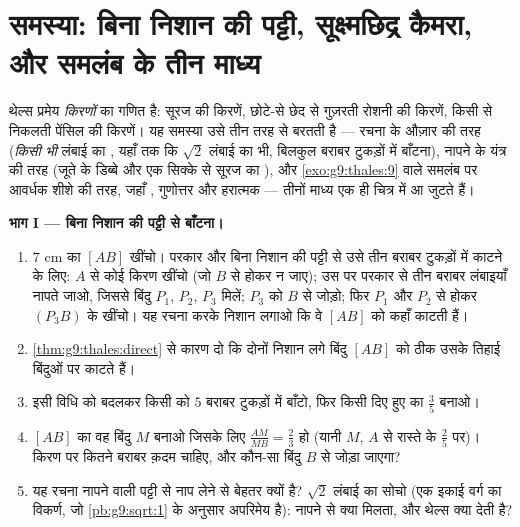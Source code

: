 \section{समस्या: बिना निशान की पट्टी, सूक्ष्मछिद्र कैमरा, और समलंब के
तीन माध्य}

\begin{problem}
\label{pb:g9:thales:1}
थेल्स प्रमेय \emph{किरणों} का गणित है: सूरज की किरणें, छोटे-से छेद से
गुज़रती रोशनी की किरणें, किसी  से निकलती पेंसिल की किरणें। यह
समस्या उसे तीन तरह से बरतती है --- रचना के औज़ार की तरह
(\emph{किसी भी} लंबाई का , यहाँ तक कि $\sqrt2$ लंबाई का भी,
बिलकुल बराबर टुकड़ों में बाँटना), नापने के यंत्र की तरह (जूते के
डिब्बे और एक सिक्के से सूरज का ), और \cref{exo:g9:thales:9} वाले
समलंब पर आवर्धक शीशे की तरह, जहाँ , गुणोत्तर और हरात्मक ---
तीनों माध्य एक ही चित्र में आ जुटते हैं।

\medskip
\noindent\textbf{भाग I --- बिना निशान की पट्टी से बाँटना।}
\begin{enumerate}
  \item $7$ cm का  $[AB]$ खींचो। परकार और बिना निशान की
        पट्टी से उसे तीन बराबर टुकड़ों में काटने के लिए: $A$ से कोई
        किरण खींचो (जो $B$ से होकर न जाए); उस पर परकार से तीन बराबर
        लंबाइयाँ नापते जाओ, जिससे बिंदु $P_1$, $P_2$, $P_3$ मिलें;
        $P_3$ को $B$ से जोड़ो; फिर $P_1$ और $P_2$ से होकर
        $(P_3 B)$ के  खींचो। यह रचना करके निशान लगाओ कि
        वे  $[AB]$ को कहाँ काटती हैं।
  \item \cref{thm:g9:thales:direct} से कारण दो कि दोनों निशान लगे
        बिंदु $[AB]$ को ठीक उसके तिहाई बिंदुओं पर काटते हैं।
  \item इसी विधि को बदलकर किसी  को $5$ बराबर टुकड़ों में
        बाँटो, फिर किसी दिए हुए  का $\frac35$ बनाओ।
  \item $[AB]$ का वह बिंदु $M$ बनाओ जिसके लिए
        $\frac{AM}{MB} = \frac23$ हो (यानी $M$, $A$ से रास्ते के
        $\frac25$ पर)। किरण पर कितने बराबर क़दम चाहिए, और कौन-सा
        बिंदु $B$ से जोड़ा जाएगा?
  \item यह रचना नापने वाली पट्टी से नाप लेने से बेहतर क्यों है?
        $\sqrt2$ लंबाई का  सोचो (एक इकाई वर्ग का विकर्ण, जो
        \cref{pb:g9:sqrt:1} के अनुसार अपरिमेय है): नापने से क्या
        मिलता, और थेल्स क्या देती है?
\end{enumerate}


\end{problem}
